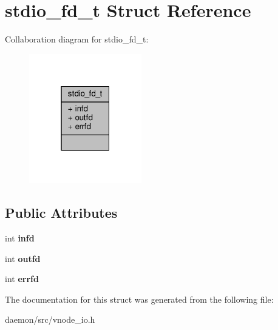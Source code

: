 \hypertarget{structstdio__fd__t}{\section{stdio\+\_\+fd\+\_\+t Struct Reference}
\label{structstdio__fd__t}
}


Collaboration diagram for stdio\+\_\+fd\+\_\+t\+:
\nopagebreak
\begin{figure}[H]
\begin{center}
\leavevmode
\includegraphics[width=139pt]{structstdio__fd__t__coll__graph}
\end{center}
\end{figure}
\subsection*{Public Attributes}
\begin{DoxyCompactItemize}
\item 
\hypertarget{structstdio__fd__t_a080aab256f4900be4e3486b3521e73a8}{int {\bfseries infd}}\label{structstdio__fd__t_a080aab256f4900be4e3486b3521e73a8}

\item 
\hypertarget{structstdio__fd__t_af610fac6d05bd17e2e4a241a8a10752a}{int {\bfseries outfd}}\label{structstdio__fd__t_af610fac6d05bd17e2e4a241a8a10752a}

\item 
\hypertarget{structstdio__fd__t_abd1dcfeecea1b895961dd6bcd772cc11}{int {\bfseries errfd}}\label{structstdio__fd__t_abd1dcfeecea1b895961dd6bcd772cc11}

\end{DoxyCompactItemize}


The documentation for this struct was generated from the following file\+:\begin{DoxyCompactItemize}
\item 
daemon/src/vnode\+\_\+io.\+h\end{DoxyCompactItemize}
